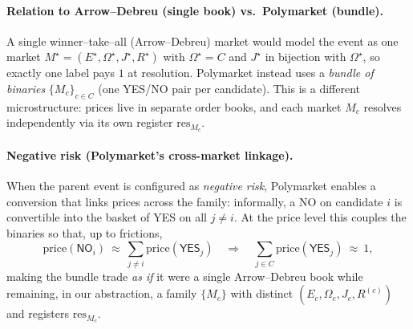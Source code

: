 \paragraph{Relation to Arrow--Debreu (single book) vs.\ Polymarket (bundle).}
A single winner–take–all (Arrow--Debreu) market would model the event as one market $M^\star=(E^\star,\Omega^\star,J^\star,R^\star)$ with
$\Omega^\star=C$ and $J^\star$ in bijection with $\Omega^\star$, so exactly one label pays $1$ at resolution.
Polymarket instead uses a \emph{bundle of binaries} $\{M_c\}_{c\in C}$ (one YES/NO pair per candidate). This is a different microstructure:
prices live in separate order books, and each market $M_c$ resolves independently via its own register $\mathrm{res}_{M_c}$.

\paragraph{Negative risk (Polymarket’s cross-market linkage).}
When the parent event is configured as \emph{negative risk}, Polymarket enables a conversion that links prices across the family:
informally, a \textsf{NO} on candidate $i$ is convertible into the basket of \textsf{YES} on all $j\neq i$.
At the price level this couples the binaries so that, up to frictions,
\[
\mathrm{price}(\textsf{NO}_i)\ \approx\ \sum_{j\neq i}\mathrm{price}(\textsf{YES}_j)
\quad\Longrightarrow\quad
\sum_{j\in C}\mathrm{price}(\textsf{YES}_j)\ \approx\ 1,
\]
making the bundle trade \emph{as if} it were a single Arrow--Debreu book while remaining, in our abstraction, a family $\{M_c\}$ with distinct $(E_c,\Omega_c,J_c,R^{(c)})$ and registers $\mathrm{res}_{M_c}$.


